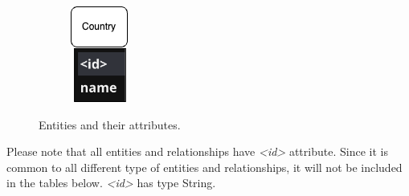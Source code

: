 \documentclass{Configuration_Files/PoliMi3i_thesis}
\begin{document}
\begin{figure}[htbp]
\begin{subfigure}[b]{0.12\linewidth}
    \includegraphics[width=\linewidth]{Project Template/Images/entities/country.drawio.png}
  \end{subfigure}
  
  \caption{Entities and their attributes.}
\end{figure}

\newpage

Please note that all entities and relationships have \textit{<id>} attribute. Since it is common to all different type of entities and relationships, it will not be included in the tables below. \textit{<id>} has type String.
\end{document}
